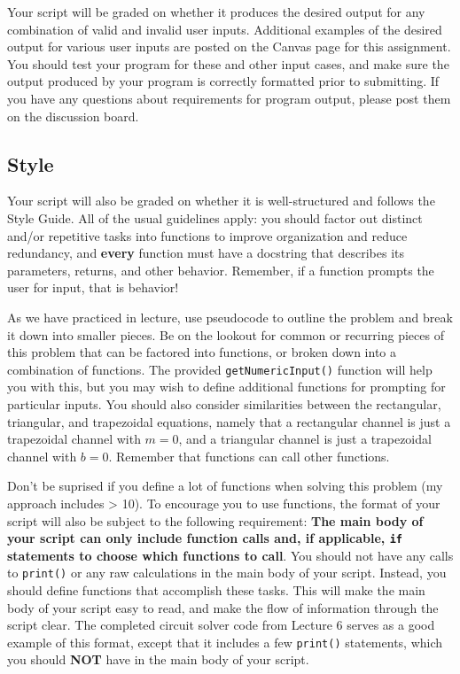 \documentclass{homework}
\begin{document}
Your script will be graded on whether it produces the desired output for any combination of valid and invalid user inputs. Additional examples of the desired output for various user inputs are posted on the Canvas page for this assignment. You should test your program for these and other input cases, and make sure the output produced by your program is correctly formatted prior to submitting. If you have any questions about requirements for program output, please post them on the discussion board.

\subsection*{Style}

Your script will also be graded on whether it is well-structured and follows the Style Guide. All of the usual guidelines apply: you should factor out distinct and/or repetitive tasks into functions to improve organization and reduce redundancy, and \textbf{every} function must have a docstring that describes its parameters, returns, and other behavior. Remember, if a function prompts the user for input, that is behavior!

As we have practiced in lecture, use pseudocode to outline the problem and break it down into smaller pieces. Be on the lookout for common or recurring pieces of this problem that can be factored into functions, or broken down into a combination of functions. The provided \texttt{getNumericInput()} function will help you with this, but you may wish to define additional functions for prompting for particular inputs. You should also consider similarities between the rectangular, triangular, and trapezoidal equations, namely that a rectangular channel is just a trapezoidal channel with $m = 0$, and a triangular channel is just a trapezoidal channel with $b = 0$. Remember that functions can call other functions.

Don't be suprised if you define a lot of functions when solving this problem (my approach includes > 10). To encourage you to use functions, the format of your script will also be subject to the following requirement: \textbf{The main body of your script can only include function calls and, if applicable, \texttt{if} statements to choose which functions to call}. You should not have any calls to \texttt{print()} or any raw calculations in the main body of your script. Instead, you should define functions that accomplish these tasks. This will make the main body of your script easy to read, and make the flow of information through the script clear. The completed circuit solver code from Lecture 6 serves as a good example of this format, except that it includes a few \texttt{print()} statements, which you should \textbf{NOT} have in the main body of your script.
\end{document}
